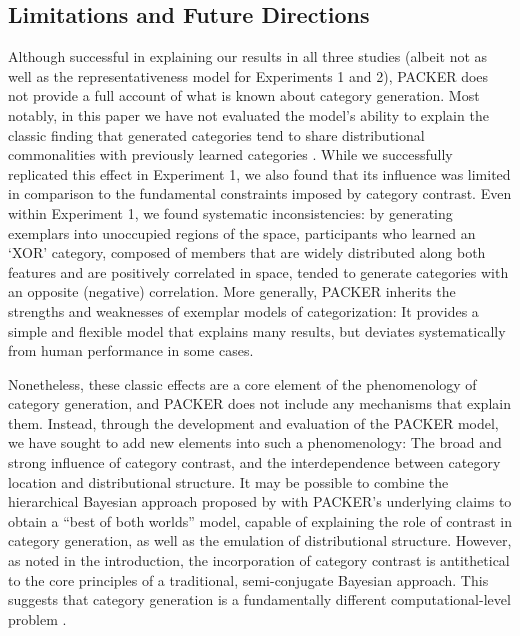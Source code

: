 \documentclass[12pt]{article}
\begin{document}
\begin{flushleft}
\subsection{Limitations and Future Directions} 

Although successful in explaining our results in all three studies (albeit not
as well as the representativeness model for Experiments 1 and 2), PACKER does
not provide a full account of what is known about category generation. Most
notably, in this paper we have not evaluated the model's ability to explain the
classic finding that generated categories tend to share distributional
commonalities with previously learned categories
\citep[see][]{jern2013probabilistic,ward1994structured}. While we successfully
replicated this effect in Experiment 1, we also found that its influence was
limited in comparison to the fundamental constraints imposed by category
contrast. Even within Experiment 1, we found systematic inconsistencies: by
generating exemplars into unoccupied regions of the space, participants who
learned an `XOR' category, composed of members that are widely distributed along
both features and are positively correlated in space, tended to generate
categories with an opposite (negative) correlation. More generally, PACKER
inherits the strengths and weaknesses of exemplar models of categorization: It
provides a simple and flexible model that explains many results, but deviates
systematically from human performance in some cases.

Nonetheless, these classic effects are a core element of the phenomenology of
category generation, and PACKER does not include any mechanisms that explain
them. Instead, through the development and evaluation of the PACKER model, we
have sought to add new elements into such a phenomenology: The broad and strong
influence of category contrast, and the interdependence between category
location and distributional structure. It may be possible to combine the
hierarchical Bayesian approach proposed by \cite{jern2013probabilistic} with
PACKER's underlying claims to obtain a ``best of both worlds'' model, capable of
explaining the role of contrast in category generation, as well as the emulation
of distributional structure. However, as noted in the introduction, the
incorporation of category contrast is antithetical to the core principles of a
traditional, semi-conjugate Bayesian approach. This suggests that category
generation is a fundamentally different computational-level problem
\citep[different from those posed by][]{jern2013probabilistic,kemp2014taxonomy}.


\end{flushleft}
\end{document}
